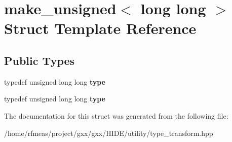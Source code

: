 \hypertarget{structmake__unsigned_3_01long_01long_01_4}{}\section{make\+\_\+unsigned$<$ long long $>$ Struct Template Reference}
\label{structmake__unsigned_3_01long_01long_01_4}
\subsection*{Public Types}
\begin{DoxyCompactItemize}
\item 
typedef unsigned long long {\bfseries type}\hypertarget{structmake__unsigned_3_01long_01long_01_4_ac47aa22928faa1ce881756388edc8052}{}\label{structmake__unsigned_3_01long_01long_01_4_ac47aa22928faa1ce881756388edc8052}

\item 
typedef unsigned long long {\bfseries type}\hypertarget{structmake__unsigned_3_01long_01long_01_4_ac47aa22928faa1ce881756388edc8052}{}\label{structmake__unsigned_3_01long_01long_01_4_ac47aa22928faa1ce881756388edc8052}

\end{DoxyCompactItemize}


The documentation for this struct was generated from the following file\+:\begin{DoxyCompactItemize}
\item 
/home/rfmeas/project/gxx/gxx/\+H\+I\+D\+E/utility/type\+\_\+transform.\+hpp\end{DoxyCompactItemize}
